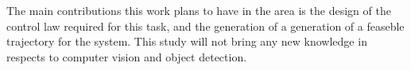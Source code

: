 The main contributions this work plans to have in the area is the design of the control law required for this task, and the generation of a generation of a feaseble trajectory for the system. This study will not bring any new knowledge in respects to computer vision and object detection.